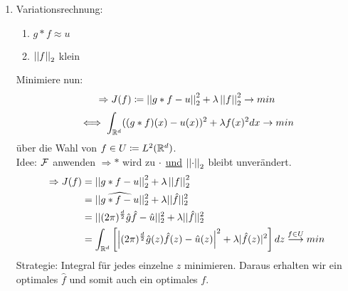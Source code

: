 \begin{enumerate}[label = \arabic*. Ansatz:]
\begin{minipage}[c]{0.4\textwidth}
\begin{center}
                        \end{center}
                    \end{minipage}
                    \item Variationsrechnung:
                        \begin{enumerate}[label = \arabic*. Wunsch:]
                            \item $g *f \approx u$
                            \item $\left|\left| f \right|\right|_2$ klein
                        \end{enumerate}
                        Minimiere nun:
                        \[\Rightarrow J(f)  \coloneqq  \left|\left| g * f - u \right|\right|_2^2 + \lambda \left|\left| f \right|\right|_2^2 \to min\]
                        \[\iff \int_{\mathbb R^d} ((g*f)(x) - u(x))^2 + \lambda f(x)^2 dx \to min\]
                        über die Wahl von $f \in U \coloneqq  L^2(\mathbb R^d)$.\\
                        Idee: $\mathcal F$ anwenden $\Rightarrow *$ wird zu $\cdot$ \underline{und} $\left|\left| \cdot \right|\right|_2$ bleibt unverändert.
                        \begin{align*}
                            \Rightarrow J(f)&=\left|\left| g*f-u \right|\right|_2^2 + \lambda\left|\left| f \right|\right|_2^2\\
                            &=||\widehat{g*f-u}||_2^2 + \lambda ||\hat f||_2^2\\
                            &=||(2 \pi)^\frac{d}{2} \hat g \hat f -\hat u||_2^2 + \lambda||\hat f||_2^2\\
                            &=\int_{\mathbb R^d}\left[ \left|(2 \pi)^\frac{d}{2} \hat g(z) \hat f(z) - \hat u(z)\right|^2 + \lambda |\hat f(z)|^2 \right] dz \overset{f \in U}{\longrightarrow} min
                        \end{align*}
                    Strategie: Integral für jedes einzelne $z$ minimieren. Daraus erhalten wir ein optimales $\hat f$ und somit auch ein optimales $f$.\\

\end{enumerate}
